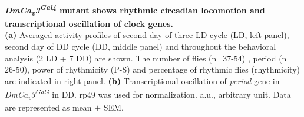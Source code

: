 \label{fig:4}
\textbf{ \emph{DmCa\textsubscript{v}3\textsuperscript{Gal4}} mutant shows rhythmic circadian locomotion and transcriptional oscillation of clock genes.}
\\
\textbf{(a)} Averaged activity profiles of second day of three LD cycle (LD, left panel), second day of DD cycle (DD, middle panel) and throughout the behavioral analysis (2 LD + 7 DD) are shown. 
The number of flies (n=37-54) , period (n = 26-50), power of rhythmicity (P-S) and percentage of rhythmic flies (rhythmicity) are indicated in right panel.  
\textbf{(b)}  Transcriptional oscillation of \emph{period} gene in  \emph{DmCa\textsubscript{v}3\textsuperscript{Gal4}} in DD. rp49 was used for normalization. a.u., arbitrary unit.
Data are represented as mean $\pm$ SEM.
  
  